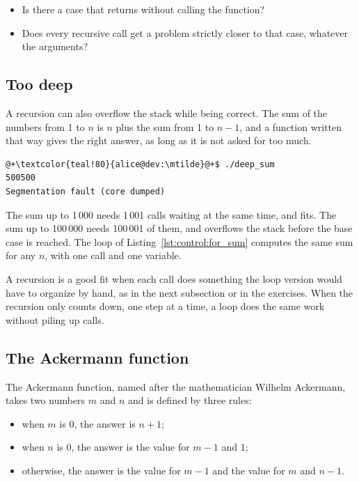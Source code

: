 \begin{itemize}
\item Is there a case that returns without calling the function?
\item Does every recursive call get a problem strictly closer to that case,
  whatever the arguments?
\end{itemize}

\subsection{Too deep}

A recursion can also overflow the stack while being correct. The sum of the
numbers from 1 to $n$ is $n$ plus the sum from 1 to $n - 1$, and a function
written that way gives the right answer, as long as it is not asked for too
much.


\vspace{-10pt}%
\begin{lstlisting}[style=bashVerb, escapechar=@+]
@+\textcolor{teal!80}{alice@dev:\mtilde}@+$ ./deep_sum
500500
Segmentation fault (core dumped)
\end{lstlisting}

The sum up to 1\,000 needs 1\,001 calls waiting at the same time, and fits. The
sum up to 100\,000 needs 100\,001 of them, and overflows the stack before the
base case is reached. The loop of Listing~\ref{lst:control:for_sum} computes the
same sum for any $n$, with one call and one variable.

A recursion is a good fit when each call does something the loop version would
have to organize by hand, as in the next subsection or in the exercises. When
the recursion only counts down, one step at a time, a loop does the same work
without piling up calls.

\subsection{The Ackermann function}
\label{sec:functions:ackermann}

The Ackermann function, named after the mathematician Wilhelm Ackermann, takes
two numbers $m$ and $n$ and is defined by three rules:

\begin{itemize}
\item when $m$ is 0, the answer is $n + 1$;
\item when $n$ is 0, the answer is the value for $m - 1$ and $1$;
\item otherwise, the answer is the value for $m - 1$ and the value for $m$ and
  $n - 1$.
\end{itemize}


